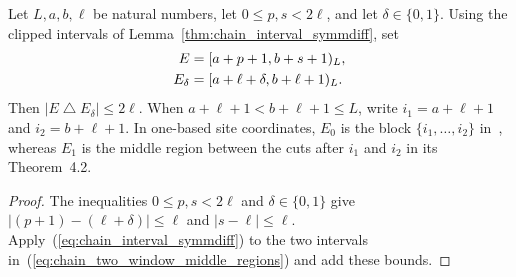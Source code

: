 \begin{lemma}
    \label{thm:chain_two_window_middle_displacement}
    \leanok
    Let $L,a,b,\ell$ be natural numbers, let $0\le p,s<2\ell$, and let
    $\delta\in\{0,1\}$. Using the clipped intervals of
    Lemma~\ref{thm:chain_interval_symmdiff}, set
    \begin{align}
        E        & =[a+p+1,b+s+1)_L,\notag      \\
        E_\delta & =[a+\ell+\delta,b+\ell+1)_L.
        \label{eq:chain_two_window_middle_regions}
    \end{align}
    Then $|E\mathbin{\triangle}E_\delta|\le2\ell$.
    When $a+\ell+1<b+\ell+1\le L$, write $i_1=a+\ell+1$ and
    $i_2=b+\ell+1$. In one-based site coordinates, $E_0$ is the block
    $\{i_1,\ldots,i_2\}$ in~\cite[Proposition~5.7]{Arad2016RigorousRG},
    whereas $E_1$ is the middle
    region between the cuts after $i_1$ and $i_2$ in its Theorem~4.2.
\end{lemma}
\begin{proof}\leanok
    The inequalities $0\le p,s<2\ell$ and $\delta\in\{0,1\}$ give
    $|(p+1)-(\ell+\delta)|\le\ell$ and $|s-\ell|\le\ell$.
    Apply~(\ref{eq:chain_interval_symmdiff}) to the two intervals
    in~(\ref{eq:chain_two_window_middle_regions}) and add these bounds.
\end{proof}

